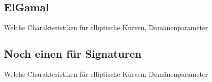 \documentclass[hidelinks]{article}
\theoremstyle{plain}
\theoremstyle{definition}
\theoremstyle{rem}
\begin{document}
\begin{sloppypar}
\subsection{ElGamal}
Welche Charakteristiken für elliptische Kurven, Domänenparameter
\subsection{Noch einen für Signaturen}
Welche Charakteristiken für elliptische Kurven, Domänenparameter

\end{sloppypar}
\newpage


\end{document}

